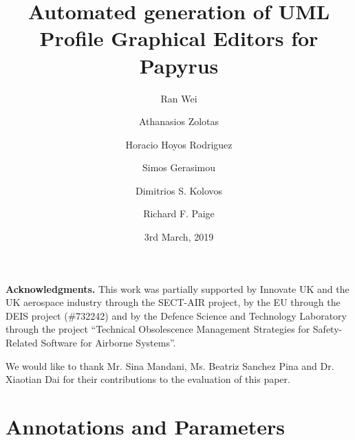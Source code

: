 \documentclass[global]{svjour}
\begin{document}
\title{Automated generation of UML Profile Graphical Editors for Papyrus}

\author{Ran Wei \and Athanasios Zolotas \and Horacio Hoyos Rodriguez \and Simos Gerasimou \and Dimitrios S. Kolovos \and Richard F. Paige}

\date{3rd March, 2019}
\maketitle{}










\noindent\textbf{Acknowledgments.}
This work was partially supported by Innovate UK and the UK aerospace industry through the SECT-AIR project, by the EU through the DEIS project (\#732242) and by the Defence Science and Technology Laboratory through the project ``Technical Obsolescence Management Strategies for Safety-Related Software for Airborne Systems''.

We would like to thank Mr. Sina Mandani, Ms. Beatriz Sanchez Pina and Dr. Xiaotian Dai for their contributions to the evaluation of this paper.
\appendix
\section{Annotations and Parameters}

%
\clearpage


\end{document}
